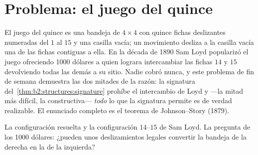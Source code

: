 \section{Problema: el juego del quince}

El juego del quince es una bandeja de $4 \times 4$ con quince fichas
deslizantes numeradas del $1$ al $15$ y una casilla vacía; un
movimiento desliza a la casilla vacía una de las fichas contiguas a
ella. En la década de 1890 Sam Loyd popularizó el juego ofreciendo
1000 dólares a quien lograra intercambiar las fichas $14$ y $15$
devolviendo todas las demás a su sitio. Nadie cobró nunca, y este
problema de fin de semana demuestra las dos mitades de la razón: la
signatura del~\cref{thm:b2:structures:signature} prohíbe el
intercambio de Loyd y ---la mitad más difícil, la constructiva---
\emph{todo} lo que la signatura permite es de verdad realizable. El
enunciado completo es el teorema de Johnson--Story (1879).

\begin{omfigure}
\qquad
{}

{\small La configuración resuelta y la configuración $14$--$15$ de
Sam Loyd. La pregunta de los 1000 dólares: ¿pueden unos
deslizamientos legales convertir la bandeja de la derecha en la de la
izquierda?}
\end{omfigure}

